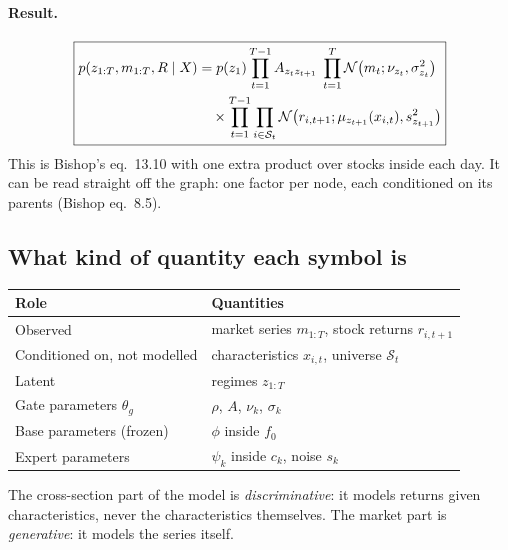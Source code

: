 \paragraph{Result.}
\begin{equation}\label{eq:joint}
\boxed{\begin{aligned}p(z_{1:T},m_{1:T},R\mid X)&=p(z_1)\prod_{t=1}^{T-1}A_{z_tz_{t+1}}\;\prod_{t=1}^{T}\mathcal{N}\big(m_t;\nu_{z_t},\sigma_{z_t}^2\big)\\&\quad\times\prod_{t=1}^{T-1}\prod_{i\in\mathcal S_t}\mathcal{N}\big(r_{i,t+1};\mu_{z_{t+1}}(x_{i,t}),s_{z_{t+1}}^2\big)\end{aligned}}
\end{equation}
This is Bishop's eq.~13.10 with one extra product over stocks inside each day. It can be read straight off the graph: one factor per node, each conditioned on its parents (Bishop eq.~8.5).

\subsection{What kind of quantity each symbol is}
\begin{center}
\renewcommand{\arraystretch}{1.25}
\begin{tabularx}{\textwidth}{@{}lX@{}}
\toprule
Role & Quantities \\
\midrule
Observed & market series $m_{1:T}$, stock returns $r_{i,t+1}$ \\
Conditioned on, not modelled & characteristics $x_{i,t}$, universe $\mathcal S_t$ \\
Latent & regimes $z_{1:T}$ \\
Gate parameters $\theta_g$ & $\rho$, $A$, $\nu_k$, $\sigma_k$ \\
Base parameters (frozen) & $\phi$ inside $f_0$ \\
Expert parameters & $\psi_k$ inside $c_k$, noise $s_k$ \\
\bottomrule
\end{tabularx}
\end{center}
The cross-section part of the model is \emph{discriminative}: it models returns given characteristics, never the characteristics themselves. The market part is \emph{generative}: it models the series itself.

